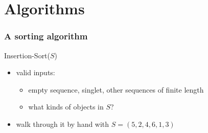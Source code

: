 %
%
%
%

\section{Algorithms}

\begin{frame}[fragile]
%
  \frametitle{A sorting algorithm}
%
    \begin{center}
      \parbox[]{.75\linewidth}{
        \begin{algorithm}[H]
          \label{alg:insertion-sort}
%
          \dontprintsemicolon
          \setalcaphskip{0ex}
%
          \caption{\sc Insertion-Sort($S$)}
          \vspace{.5em}
%
          \vspace{.5em}
%
        \end{algorithm}
      }
    \end{center}
%
  \begin{itemize}
%
  \item valid inputs:
    \begin{itemize}
    \item empty sequence, singlet, other sequences of finite length
    \item what kinds of objects in $S$?
    \end{itemize}
%
  \item walk through it by hand with $S = (5, 2, 4, 6, 1, 3)$
%
  \end{itemize}
%
\end{frame}

